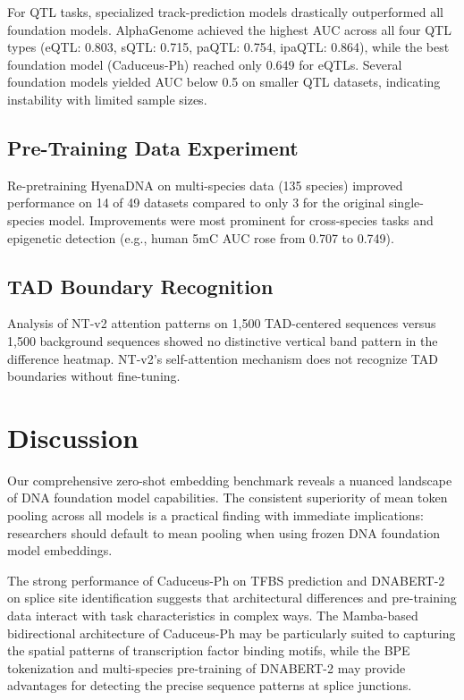 \documentclass[11pt]{article}
\begin{document}
For QTL tasks, specialized track-prediction models drastically outperformed all foundation models. AlphaGenome achieved the highest AUC across all four QTL types (eQTL: 0.803, sQTL: 0.715, paQTL: 0.754, ipaQTL: 0.864), while the best foundation model (Caduceus-Ph) reached only 0.649 for eQTLs. Several foundation models yielded AUC below 0.5 on smaller QTL datasets, indicating instability with limited sample sizes.

\subsection{Pre-Training Data Experiment}

Re-pretraining HyenaDNA on multi-species data (135 species) improved performance on 14 of 49 datasets compared to only 3 for the original single-species model. Improvements were most prominent for cross-species tasks and epigenetic detection (e.g., human 5mC AUC rose from 0.707 to 0.749).

\subsection{TAD Boundary Recognition}

Analysis of NT-v2 attention patterns on 1,500 TAD-centered sequences versus 1,500 background sequences showed no distinctive vertical band pattern in the difference heatmap. NT-v2's self-attention mechanism does not recognize TAD boundaries without fine-tuning.

\section{Discussion}

Our comprehensive zero-shot embedding benchmark reveals a nuanced landscape of DNA foundation model capabilities. The consistent superiority of mean token pooling across all models is a practical finding with immediate implications: researchers should default to mean pooling when using frozen DNA foundation model embeddings.

The strong performance of Caduceus-Ph on TFBS prediction and DNABERT-2 on splice site identification suggests that architectural differences and pre-training data interact with task characteristics in complex ways. The Mamba-based bidirectional architecture of Caduceus-Ph may be particularly suited to capturing the spatial patterns of transcription factor binding motifs, while the BPE tokenization and multi-species pre-training of DNABERT-2 may provide advantages for detecting the precise sequence patterns at splice junctions.
\end{document}
